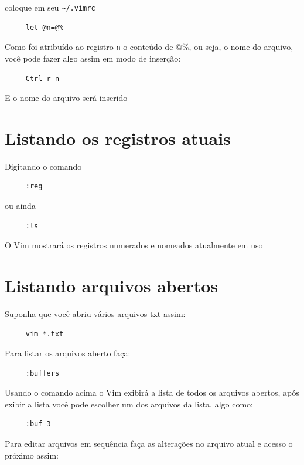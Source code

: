 \documentclass[10pt,a4paper,openany]{book}
\begin{document}
coloque em seu \verb+~/.vimrc+

\begin{verbatim}
     let @n=@%
\end{verbatim}

Como foi atribuído ao registro \verb+n+ o conteúdo de @\%, ou seja, o nome
do arquivo, você pode fazer algo assim em modo de inserção:

\begin{verbatim}
     Ctrl-r n
\end{verbatim}

E o nome do arquivo será inserido

\section{Listando os registros atuais}
\label{Listando os registros atuais}
Digitando o comando

\begin{verbatim}
     :reg
\end{verbatim}

ou ainda

\begin{verbatim}
     :ls
\end{verbatim}

O Vim mostrará os registros numerados e nomeados atualmente em uso

\section{Listando arquivos abertos}
\label{Listando arquivos abertos}
Suponha que você abriu vários arquivos txt assim:

\begin{verbatim}
     vim *.txt
\end{verbatim}

Para listar os arquivos aberto faça:

\begin{verbatim}
     :buffers
\end{verbatim}

Usando o comando acima o Vim exibirá a lista de todos os arquivos
abertos, após exibir a lista você pode escolher um dos arquivos da
lista, algo como:

\begin{verbatim}
     :buf 3
\end{verbatim}

Para editar arquivos em sequência faça as alterações no arquivo atual
e acesso o próximo assim:
\end{document}
